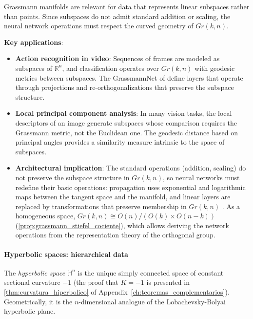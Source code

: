 Grassmann manifolds are relevant for data that represents linear subspaces rather than points. Since subspaces do not admit standard addition or scaling, the neural network operations must respect the curved geometry of $Gr(k,n)$.

\textbf{Key applications}:
\begin{itemize}
    \item \textbf{Action recognition in video}: Sequences of frames are modeled as subspaces of $\mathbb{R}^n$, and classification operates over $Gr(k,n)$ with geodesic metrics between subspaces. The GrassmannNet of \citet{huang2017grassmann} define layers that operate through projections and re-orthogonalizations that preserve the subspace structure.

    \item \textbf{Local principal component analysis}: In many vision tasks, the local descriptors of an image generate subspaces whose comparison requires the Grassmann metric, not the Euclidean one. The geodesic distance based on principal angles provides a similarity measure intrinsic to the space of subspaces.

    \item \textbf{Architectural implication}: The standard operations (addition, scaling) do not preserve the subspace structure in $Gr(k,n)$, so neural networks must redefine their basic operations: propagation uses exponential and logarithmic maps between the tangent space and the manifold, and linear layers are replaced by transformations that preserve membership in $Gr(k,n)$ \citep{huang2017grassmann}. As a homogeneous space, $Gr(k,n) \cong O(n)/(O(k) \times O(n-k))$ (\autoref{prop:grassmann_stiefel_cociente}), which allows deriving the network operations from the representation theory of the orthogonal group.
\end{itemize}


\paragraph{Hyperbolic spaces: hierarchical data}

\begin{definition}\label{def:espacio_hiperbolico}
The \textit{hyperbolic space} $\mathbb{H}^n$ is the unique simply connected space of constant sectional curvature $-1$ (the proof that $K = -1$ is presented in \autoref{thm:curvatura_hiperbolico} of Appendix~\ref{ch:teoremas_complementarios}). Geometrically, it is the $n$-dimensional analogue of the Lobachevsky-Bolyai hyperbolic plane.
\end{definition}

